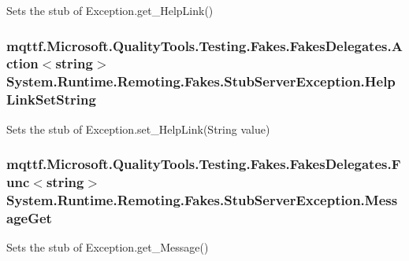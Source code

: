 Sets the stub of Exception.\-get\-\_\-\-Help\-Link()

\hypertarget{class_system_1_1_runtime_1_1_remoting_1_1_fakes_1_1_stub_server_exception_a66d093b1d57e87a4aea1dc0f5b43a023}{
\subsubsection[{Help\-Link\-Set\-String}]{\setlength{\rightskip}{0pt plus 5cm}mqttf.\-Microsoft.\-Quality\-Tools.\-Testing.\-Fakes.\-Fakes\-Delegates.\-Action$<$string$>$ System.\-Runtime.\-Remoting.\-Fakes.\-Stub\-Server\-Exception.\-Help\-Link\-Set\-String}}\label{class_system_1_1_runtime_1_1_remoting_1_1_fakes_1_1_stub_server_exception_a66d093b1d57e87a4aea1dc0f5b43a023}


Sets the stub of Exception.\-set\-\_\-\-Help\-Link(\-String value)

\hypertarget{class_system_1_1_runtime_1_1_remoting_1_1_fakes_1_1_stub_server_exception_ab7415fd072f5e6755071b45b7044a122}{
\subsubsection[{Message\-Get}]{\setlength{\rightskip}{0pt plus 5cm}mqttf.\-Microsoft.\-Quality\-Tools.\-Testing.\-Fakes.\-Fakes\-Delegates.\-Func$<$string$>$ System.\-Runtime.\-Remoting.\-Fakes.\-Stub\-Server\-Exception.\-Message\-Get}}\label{class_system_1_1_runtime_1_1_remoting_1_1_fakes_1_1_stub_server_exception_ab7415fd072f5e6755071b45b7044a122}


Sets the stub of Exception.\-get\-\_\-\-Message()

